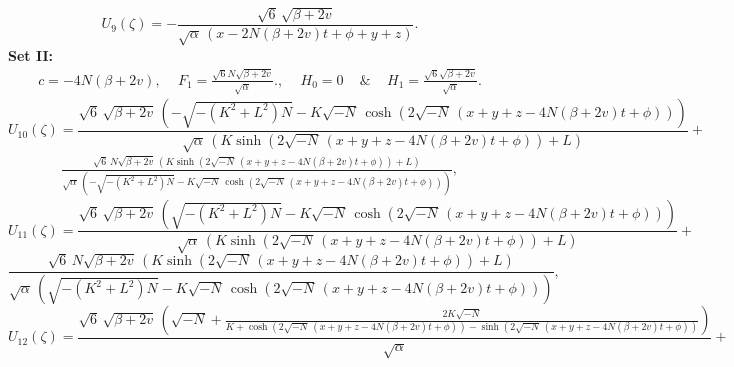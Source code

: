 \documentclass{article}
\numberwithin{equation}{section}
\begin{document}
\begin{equation}\label{U9}
    U_{9} \! \left(\zeta \right) =
-\frac{\sqrt{6}\, \sqrt{\beta +2 v}}{\sqrt{\alpha}\, \left(x -2 N \left(\beta +2 v \right) t +\phi +y +z \right)}.
\end{equation}
\textbf{Set II:}
\begin{eqnarray}\label{set2}
c = -4N(\beta+2v),\quad\,F_{1} = \frac{\sqrt{6}N\sqrt{\beta+2v}}{\sqrt{\alpha}}.,\quad\, H_{0} = 0\quad\,{\&}\quad\,H_{1} = \frac{\sqrt{6}\sqrt{\beta+2v}}{\sqrt{\alpha}}.
\end{eqnarray}
\begin{equation}\label{U10}
    U_{10}\! \left(\zeta \right) =
\frac{\sqrt{6}\, \sqrt{\beta +2 v}\, \left(-\sqrt{-\left(K^{2}+L^{2}\right) N}-K \sqrt{-N}\, \cosh \! \left(2 \sqrt{-N}\, \left(x +y +z -4 N \left(\beta +2 v \right) t +\phi \right)\right)\right)}{\sqrt{\alpha}\, \left(K \sinh \! \left(2 \sqrt{-N}\, \left(x +y +z -4 N \left(\beta +2 v \right) t +\phi \right)\right)+L \right)}+\nonumber
\end{equation}
\begin{eqnarray}
\frac{\sqrt{6}\, N \sqrt{\beta +2 v}\, \left(K \sinh \! \left(2 \sqrt{-N}\, \left(x +y +z -4 N \left(\beta +2 v \right) t +\phi \right)\right)+L \right)}{\sqrt{\alpha}\, \left(-\sqrt{-\left(K^{2}+L^{2}\right) N}-K \sqrt{-N}\, \cosh \! \left(2 \sqrt{-N}\, \left(x +y +z -4 N \left(\beta +2 v \right) t +\phi \right)\right)\right)},
\end{eqnarray}
\begin{equation}\label{U11}
    U_{11}\! \left(\zeta \right) =
\frac{\sqrt{6}\, \sqrt{\beta +2 v}\, \left(\sqrt{-\left(K^{2}+L^{2}\right) N}-K \sqrt{-N}\, \cosh \! \left(2 \sqrt{-N}\, \left(x +y +z -4 N \left(\beta +2 v \right) t +\phi \right)\right)\right)}{\sqrt{\alpha}\, \left(K \sinh \! \left(2 \sqrt{-N}\, \left(x +y +z -4 N \left(\beta +2 v \right) t +\phi \right)\right)+L \right)}+\nonumber
\end{equation}
\begin{equation}
\frac{\sqrt{6}\, N \sqrt{\beta +2 v}\, \left(K \sinh \! \left(2 \sqrt{-N}\, \left(x +y +z -4 N \left(\beta +2 v \right) t +\phi \right)\right)+L \right)}{\sqrt{\alpha}\, \left(\sqrt{-\left(K^{2}+L^{2}\right) N}-K \sqrt{-N}\, \cosh \! \left(2 \sqrt{-N}\, \left(x +y +z -4 N \left(\beta +2 v \right) t +\phi \right)\right)\right)},
\end{equation}
\begin{equation}\label{U12}
    U_{12}\! \left(\zeta \right) =
\frac{\sqrt{6}\, \sqrt{\beta +2 v}\, \left(\sqrt{-N}+\frac{2 K \sqrt{-N}}{K +\cosh \left(2 \sqrt{-N}\, \left(x +y +z -4 N \left(\beta +2 v \right) t +\phi \right)\right)-\sinh \left(2 \sqrt{-N}\, \left(x +y +z -4 N \left(\beta +2 v \right) t +\phi \right)\right)}\right)}{\sqrt{\alpha}}+\nonumber
\end{equation}
\end{document}
